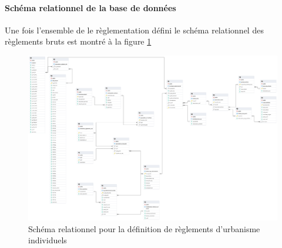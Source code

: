    \paragraph{Schéma relationnel de la base de données}
    Une fois l'ensemble de le règlementation défini le schéma relationnel des règlements bruts est montré à la figure \ref{fig:offstreet_db_erd_park_mins_reg_raw}
    \begin{figure}[h]
        \centering
        \includegraphics[trim={15cm 15cm 40cm 42.5cm},clip,width=12.5cm]{images/structure_base_de_donnee.png}
        \caption{Schéma relationnel pour la définition de règlements d'urbanisme individuels}
        \label{fig:offstreet_db_erd_park_mins_reg_raw}
    \end{figure}
    \FloatBarrier
